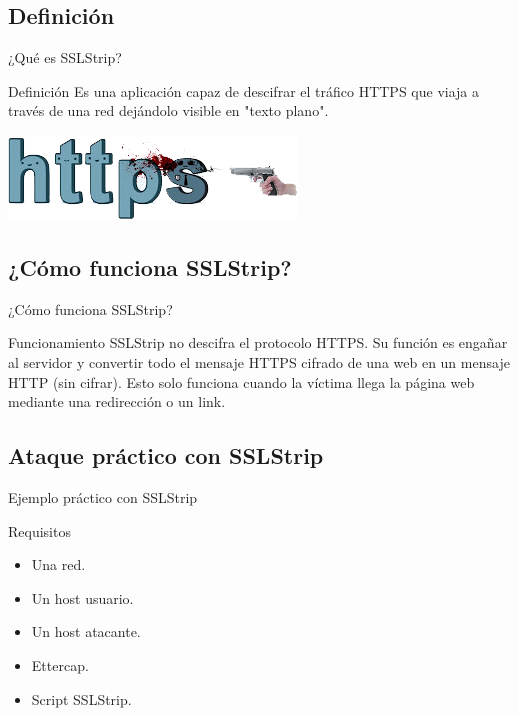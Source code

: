 \documentclass{beamer}
\begin{document}
\subsection{Definición}
\begin{frame}{¿Qué es SSLStrip?}
	\begin{block}{Definición}
		Es una aplicación capaz de descifrar el tráfico HTTPS que viaja a través de una red dejándolo visible en "texto plano".
	\end{block}
	\begin{center}
		\includegraphics[scale=0.75]{https.png}
	\end{center}
\end{frame}

\subsection{¿Cómo funciona SSLStrip?}
\begin{frame}{¿Cómo funciona SSLStrip?}
	\begin{block}{Funcionamiento}
		SSLStrip no descifra el protocolo HTTPS. Su función es engañar al servidor y convertir todo el mensaje HTTPS cifrado de una web en un mensaje HTTP (sin cifrar). Esto solo funciona cuando la víctima llega la página web mediante una redirección o un link.
	\end{block}
\end{frame}

\subsection{Ataque práctico con SSLStrip}
\begin{frame}{Ejemplo práctico con SSLStrip}
	\begin{block}{Requisitos}
		\begin{itemize}
			\item Una red.
			\item Un host usuario.
			\item Un host atacante.
			\item Ettercap.
			\item Script SSLStrip.
		\end{itemize}
	\end{block}	
\end{frame}
\end{document}
